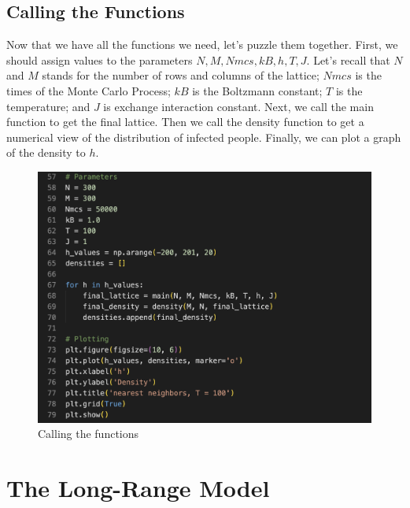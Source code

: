 \documentclass[11pt]{book}
\begin{document}
\subsection{Calling the Functions}

Now that we have all the functions we need, let's puzzle them together. First, we should assign values to the parameters $N, M, Nmcs, kB, h, T, J$. Let's recall that $N$ and $M$ stands for the number of rows and columns of the lattice; $Nmcs$ is the times of the Monte Carlo Process; $kB$ is the Boltzmann constant; $T$ is the temperature; and $J$ is exchange interaction constant. Next, we call the main function to get the final lattice. Then we call the  density function to get a numerical view of the distribution of infected people. Finally, we can plot a graph of the density to $h$.

\begin{figure}
    \centering
    \includegraphics[width=1\linewidth]{nn_callingtheFunctions.png}
    \caption{Calling the functions}
    \label{fig45}
\end{figure}

\section{The Long-Range Model}
\end{document}
